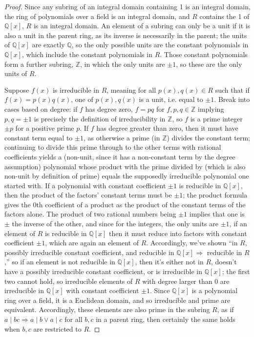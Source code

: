 \documentclass{article}
\begin{document}
\begin{proof}
  Since any subring of an integral domain containing 1 is an integral domain, the ring of polynomials over a field is an integral domain,
  and $R$ contains the 1 of $\mathbb{Q}[x]$, $R$ is an integral domain.
  An element of a subring can only be a unit if it is also a unit in the parent ring, as its inverse is necessarily in the parent;
  the units of $\mathbb{Q}[x]$ are exactly $\mathbb{Q}$, so the only possible units are the constant polynomials in $\mathbb{Q}[x]$,
  which include the constant polynomials in $R$.
  Those constant polynomials form a further subring, $\mathbb{Z}$, in which the only units are $\pm 1$, so these are the only units of $R$.

  Suppose $f(x)$ is irreducible in $R$, meaning for all $p(x), q(x) \in R$ such that if $f(x) = p(x)q(x)$, one of $p(x), q(x)$ is a unit,
  i.e. equal to $\pm 1$.
  Break into cases based on degree: if $f$ has degree zero, $f = pq$ for $f, p, q \in \mathbb{Z}$ implying $p, q = \pm 1$
  is precisely the definition of irreducibility in $\mathbb{Z}$, so $f$ is a prime integer $\pm p$ for a positive prime $p$.
  If $f$ has degree greater than zero, then it must have constant term equal to $\pm 1$, as otherwise a prime (in $\mathbb{Z}$) divides
  the constant term; continuing to divide this prime through to the other terms with rational coefficients yields a
  (non-unit, since it has a non-constant term by the degree assumption) polynomial whose product with
  the prime divided by (which is also non-unit by definition of prime) equals the supposedly irreducible polynomial one started with.
  If a polynomial with constant coefficient $\pm1$ is reducible in $\mathbb{Q}[x]$, then the product of the factors' constant terms must be $\pm1$;
  the product formula gives the 0th coefficient of a product as the product of the constant terms of the factors alone.
  The product of two rational numbers being $\pm 1$ implies that one is $\pm$ the inverse of the other,
  and since for the integers, the only units are $\pm 1$, if an element of $R$ is reducible in $\mathbb{Q}[x]$ then it must reduce into factors
  with constant coefficient $\pm 1$, which are again an element of $R$.
  Accordingly, we've shown ``in $R$, possibly irreducible constant coefficient, and reducible in $\mathbb{Q}[x] \Rightarrow$ reducible in $R$,''
  so if an element is not reducible in $\mathbb{Q}[x]$, then it's either not in $R$, doesn't have a possibly irreducible constant coefficient,
  or is irreducible in $\mathbb{Q}[x]$; the first two cannot hold, so irreducible elements of $R$ with degree larger than 0 are irreducible
  in $\mathbb{Q}[x]$ with constant coefficient $\pm 1$.
  Since $\mathbb{Q}[x]$ is a polynomial ring over a field, it is a Euclidean domain, and so irreducible and prime are equivalent.
  Accordingly, these elements are also prime in the subring $R$, as if $a \mid bc \Rightarrow a \mid b \lor a \mid c$ for all $b, c$
  in a parent ring, then certainly the same holds when $b, c$ are restricted to $R$.


\end{proof}
\end{document}
